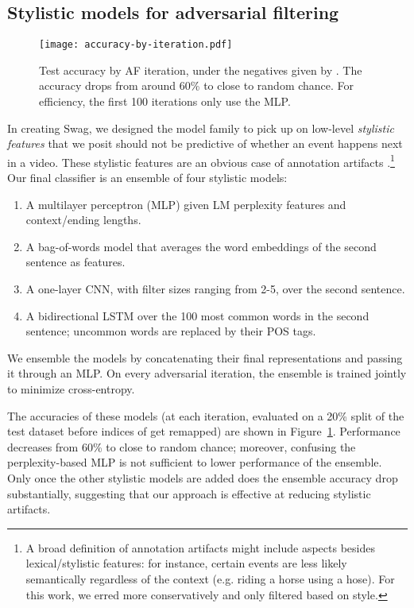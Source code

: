 \documentclass[11pt,a4paper]{article}
\newcommand\customfont[1]{{\usefont{T1}{perm}{m}{n}#1}}
\newcommand{\datasetname}{{\small\customfont{Swag}}}
\begin{document}
\subsection{Stylistic models for adversarial filtering}

\begin{figure}
    \centering
    \texttt{[image: accuracy-by-iteration.pdf]}
    \vspace*{-7mm}
    \caption{Test accuracy by AF iteration, under the negatives given by .  The accuracy drops from around 60\% to close to random chance. For efficiency, the first 100 iterations only use the MLP.}\vspace{-1mm}
    \label{fig:adv_filtering}
\end{figure}
In creating \datasetname, we designed the model family  to pick up on low-level \emph{stylistic features} that we posit should not be predictive of whether an event happens next in a video. These stylistic features are an obvious case of annotation artifacts \cite{cai2017pay, Schwartz:2017}.\footnote{A broad definition of annotation artifacts might include aspects besides lexical/stylistic features: for instance, certain events are less likely semantically regardless of the context (e.g. riding a horse using a hose). For this work, we erred more conservatively and only filtered based on style.} 
Our final classifier is an ensemble of four stylistic models:
\begin{enumerate}[wide, labelwidth=!,labelindent=0pt,noitemsep,topsep=0pt,label=\textbf{\arabic*}.]
    \item A multilayer perceptron (MLP) given LM perplexity features and context/ending lengths. \item A bag-of-words model that averages the word embeddings of the second sentence as features. \item A one-layer CNN, with filter sizes ranging from 2-5, over the second sentence. \item A bidirectional LSTM over the 100 most common words in the second sentence; uncommon words are replaced by their POS tags. \end{enumerate}
We ensemble the models by concatenating their final representations and passing it through an MLP. On every adversarial iteration, the ensemble is trained jointly to minimize cross-entropy. 

The accuracies of these models (at each iteration, evaluated on a 20\% split of the test dataset before indices of  get remapped) are shown in Figure~\ref{fig:adv_filtering}. Performance decreases from 60\% to close to random chance; moreover, confusing the perplexity-based MLP is not sufficient to lower performance of the ensemble. Only once the other stylistic models are added does the ensemble accuracy drop substantially, suggesting that our approach is effective at reducing stylistic artifacts. 
\end{document}
